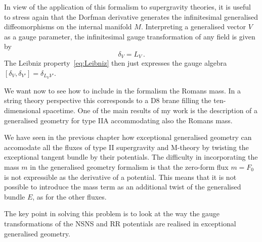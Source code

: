 \documentclass[debug]{phd}
\begin{document}
					In view of the application of this formalism to supergravity theories, it is useful to stress again that the Dorfman derivative generates the infinitesimal generalised diffeomorphisms on the internal manifold $M$. 
					Interpreting a generalised vector $V$ as a gauge parameter, the infinitesimal gauge transformation of any field is given by
							\begin{equation*}
								\delta_V = L_V \, .
							\end{equation*}
					The Leibniz property~\eqref{eq:Leibniz} then just expresses the gauge algebra $[\delta_V, \delta_{V'}] = \delta_{L_V V'}$. 
					
					

						We want now to see how to include in the formalism the Romans mass. 	
						In a string theory perspective this corresponds to a D$8$ brane filling the ten-dimensional spacetime.
						One of the main results of my work is the description of a generalised geometry for type IIA accommodating also the Romans mass.
						
						We have seen in the previous chapter how exceptional generalised geometry can accomodate all the fluxes of type II supergravity and M-theory by twisting the exceptional tangent bundle by their potentials.
The difficulty in incorporating the mass $m$ in the generalised geometry formalism is that the zero-form flux $m = F_0$ is not expressible as the derivative of a potential.
						This means that it is not possible to introduce the mass term as an additional twist of the generalised bundle $E$, as for the other fluxes.
						
						The key point in solving this problem is to look at the way the gauge transformations of the NSNS and RR potentials are realised in exceptional generalised geometry.
						
\end{document}
